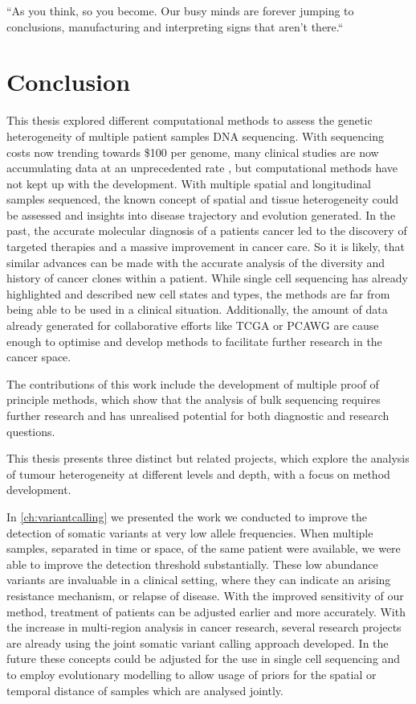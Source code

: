 
\begin{savequote}[85mm]
``As you think, so you become. Our busy minds are forever jumping to conclusions, manufacturing and interpreting signs that aren’t there.``
\end{savequote}


\chapter{Conclusion}
\label{ch:conclusion}

This thesis explored different computational methods to assess the genetic heterogeneity of multiple patient samples DNA sequencing. With sequencing costs now trending towards \$100 per genome, many clinical studies are now accumulating data at an unprecedented rate \cite{Stephens2015}, but computational methods have not kept up with the development. With multiple spatial and longitudinal samples sequenced, the known concept of spatial and tissue heterogeneity could be assessed and insights into disease trajectory and evolution generated. In the past, the accurate molecular diagnosis of a patients cancer led to the discovery of targeted therapies and a massive improvement in cancer care. So it is likely, that similar advances can be made with the accurate analysis of the diversity and history of cancer clones within a patient. While single cell sequencing has already highlighted and described new cell states and types, the methods are far from being able to be used in a clinical situation. Additionally, the amount of data already generated for collaborative efforts like TCGA \cite{IPCAWGC2020} or PCAWG are cause enough to optimise and develop methods to facilitate further research in the cancer space.

The contributions of this work include the development of multiple proof of principle methods, which show that the analysis of bulk sequencing requires further research and has unrealised potential for both diagnostic and research questions.

This thesis presents three distinct but related projects, which explore the analysis of tumour heterogeneity at different levels and depth, with a focus on method development.

In \autoref{ch:variantcalling} we presented the work we conducted to improve the detection of somatic variants at very low allele frequencies. When multiple samples, separated in time or space, of the same patient were available, we were able to improve the detection threshold substantially. These low abundance variants are invaluable in a clinical setting, where they can indicate an arising resistance mechanism, or relapse of disease. With the improved sensitivity of our method, treatment of patients can be adjusted earlier and more accurately. With the increase in multi-region analysis in cancer research, several research projects are already using the joint somatic variant calling approach developed. In the future these concepts could be adjusted for the use in single cell sequencing and to employ evolutionary modelling to allow usage of priors for the spatial or temporal distance of samples which are analysed jointly.

